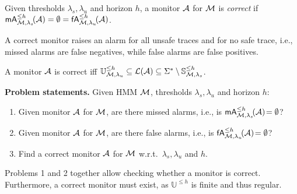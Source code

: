 \documentclass[runningheads]{llncs}
\newcommand{\safetraces}[2]{\mathbb{S}_{#1}^{#2}}
\newcommand{\unsafetraces}[2]{\mathbb{U}_{#1}^{#2}}
\newcommand{\missedalarms}[2]{\mathsf{mA}_{#1}^{#2}}
\newcommand{\falsealarms}[2]{\mathsf{fA}_{#1}^{#2}}
\begin{document}
\begin{definition}\label{def:cormon}
    Given thresholds $\lambda_s,\lambda_u$ and horizon $h$, a monitor $\mathcal{A}$ for $\mathcal{M}$ is \emph{correct} if $\missedalarms{\mc,\lambda_s}{\leq h}\!(\dfa) = \emptyset = \falsealarms{\mc,\lambda_u}{\leq h}\!(\dfa)$.
\end{definition}
A correct monitor raises an alarm for all unsafe traces and for no safe trace, i.e., missed alarms are false negatives, while false alarms are false positives.
\begin{corollary}%
    A monitor $\mathcal{A}$ is correct iff $ \unsafetraces{\mc,\lambda_u}{\leq h} \subseteq \lang{\dfa} \subseteq \alphabet^* \setminus \safetraces{\mc, \lambda_s}{\leq h}$.%
\end{corollary}
\begin{mdframed}\textbf{Problem statements.} %
    Given HMM $\mathcal{M}$, thresholds $\lambda_s,\lambda_u$ and horizon $h$:
    \begin{enumerate}[topsep=2pt]
        \item\label{prob:MA} Given monitor $\mathcal{A}$ for $\mathcal{M}$, are there  missed alarms, i.e., is $\missedalarms{\mc,\lambda_s}{\leq h}\!(\dfa)\! = \emptyset$?
        \item\label{prob:FA} Given monitor $\mathcal{A}$ for $\mathcal{M}$, are there false alarms, i.e., is $\falsealarms{\mc,\lambda_u}{\leq h}\!(\dfa)\! = \emptyset$?
        \item\label{prob:Learn} Find a correct monitor $\mathcal{A}$ for $\mathcal{M}$ w.r.t.\ $\lambda_s, \lambda_u$ and $h$.
    \end{enumerate}
\end{mdframed}
Problems 1 and 2 together allow checking whether a monitor is correct.
Furthermore, a correct monitor must exist, as $\unsafetraces{}{\leq h}$ is finite and thus regular.
\end{document}
